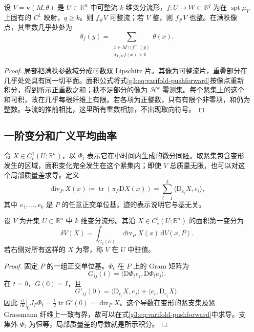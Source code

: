\begin{proposition}\label{g3:prop:rectifiable-varifold-pushforward}
	设 \(V=\mathbf v(M,\theta)\) 是 \(U\subset\mathbb R^n\) 中可整流 \(k\) 维变分流形，\(f:U\to W\subset\mathbb R^q\) 为在 \(\operatorname{spt}\mu_V\) 上固有的 \(C^1\) 映射，\(q\ge k\)。则 \(f_\#V\) 可整流；若 \(V\) 整，则 \(f_\#V\) 也整。在满秩像点，其重数几乎处处为
	\[
		\theta_f(y)=\sum_{\substack{x\in M\cap f^{-1}(y)\\J_{\mathrm{T}_xM}f(x)>0}}\theta(x).
	\]
\end{proposition}
\begin{proof}
	局部把满秩参数域分成可数双 Lipschitz 片。其像为可整流片，重叠部分在几乎处处具有同一切平面。面积公式将式\eqref{g3:eq:varifold-pushforward}按像点重新积分，得到所示正重数之和；秩不足部分的像为 \(\mathcal H^k\) 零测集。每个紧集上的这个和可积，故在几乎每根纤维上有限。若各项为正整数，只有有限个非零项，和仍为整数。与流的推前相比，这里所有重数相加，不出现取向符号。
\end{proof}

\subsection{一阶变分和广义平均曲率}
\label{g3:subsec:2304:02}
令 \(X\in C_c^1(U;\mathbb R^n)\)，以 \(\Phi_t\) 表示它在小时间内生成的微分同胚。取紧集包含变形发生的区域，面积变化完全发生在这个紧集内；即使 \(V\) 总质量无限，也可以对这个局部质量差求导。定义
\[
	\operatorname{div}_P X(x)
	\coloneqq\operatorname{tr}(\pi_P\mathrm DX(x))
	=\sum_{i=1}^k\langle\mathrm D_{e_i}X,e_i\rangle,
\]
其中 \(e_1,\ldots,e_k\) 是 \(P\) 的任意正交单位基。迹的表示说明它与基无关。

\begin{proposition}\label{g3:prop:varifold-first-variation}
	设 \(V\) 为开集 \(U\subset\mathbb R^n\) 中 \(k\) 维变分流形。其沿 \(X\in C_c^1(U;\mathbb R^n)\) 的面积第一变分为
	\begin{equation}\label{g3:eq:varifold-first-variation}
		\delta V(X)=\int_{G_k(U)}\operatorname{div}_P X(x)\,\mathrm dV(x,P).
	\end{equation}
	若右侧对所有这样的 \(X\) 为零，称 \(V\) 在 \(U\) 中驻值。
\end{proposition}
\begin{proof}
	固定 \(P\) 的一组正交单位基。\(\Phi_t\) 在 \(P\) 上的 Gram 矩阵为
	\[
		G_{ij}(t)=\langle\mathrm D\Phi_t e_i,\mathrm D\Phi_t e_j\rangle.
	\]
	在 \(t=0\)，\(G(0)=I\)，且
	\[
		G'_{ij}(0)=\langle\mathrm D_{e_i}X,e_j\rangle+
		\langle e_i,\mathrm D_{e_j}X\rangle.
	\]
	因此 \(\left.\frac{\mathrm d}{\mathrm dt}\right|_0J_P\Phi_t
	=\frac12\operatorname{tr}G'(0)=\operatorname{div}_PX\)。这个导数在变形的紧支集及紧 Grassmann 纤维上一致有界，故可以在式\eqref{g3:eq:varifold-pushforward}中求导。支集外 \(\Phi_t\) 为恒等，局部质量差的导数就是所示积分。
\end{proof}


